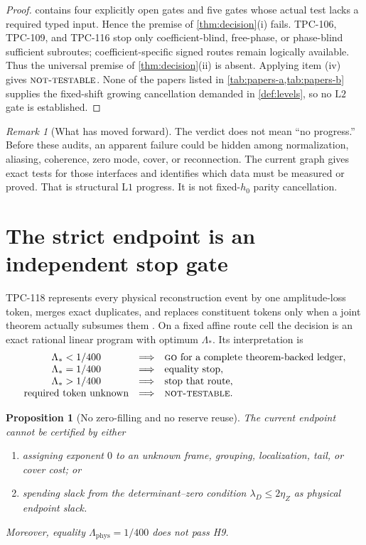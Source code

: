 \documentclass[11pt,a4paper]{article}
\newtheorem{proposition}[theorem]{Proposition}
\theoremstyle{definition}
\theoremstyle{remark}
\newtheorem{remark}[theorem]{Remark}
\newcommand{\Lone}{\mathrm{L1}}
\newcommand{\Ltwo}{\mathrm{L2}}
\newcommand{\Lam}{\Lambda_{\mathrm{phys}}}
\newcommand{\GO}{\textnormal{\textsc{go}}}
\newcommand{\NT}{\textnormal{\textsc{not-testable}}}
\begin{document}
\begin{proof}
 contains four explicitly open gates and five gates
whose actual test lacks a required typed input.  Hence the premise of
\cref{thm:decision}(i) fails.  TPC-106, TPC-109, and TPC-116 stop
only coefficient-blind, free-phase, or phase-blind sufficient
subroutes; coefficient-specific signed routes remain logically
available.  Thus the universal premise of
\cref{thm:decision}(ii) is absent.  Applying item (iv) gives
\(\NT\).  None of the papers listed in
\cref{tab:papers-a,tab:papers-b} supplies the fixed-shift growing
cancellation demanded in \cref{def:levels}, so no \(\Ltwo\) gate is
established.
\end{proof}

\begin{remark}[What has moved forward]
The verdict does not mean ``no progress.''  Before these audits, an
apparent failure could be hidden among normalization, aliasing,
coherence, zero mode, cover, or reconnection.  The current graph gives
exact tests for those interfaces and identifies which data must be
measured or proved.  That is structural \(\Lone\) progress.  It is
not fixed-\(h_0\) parity cancellation.
\end{remark}

\section{The strict endpoint is an independent stop gate}

TPC-118 represents every physical reconstruction event by one
amplitude-loss token, merges exact duplicates, and replaces
constituent tokens only when a joint theorem actually subsumes them
\citep{WangTPC118}.  On a fixed affine route cell the decision is an
exact rational linear program with optimum \(\Lambda_*\).  Its
interpretation is
\[
\begin{array}{ccl}
\Lambda_*<1/400
 &\Longrightarrow& \GO\ \text{for a complete theorem-backed ledger},\\
\Lambda_*=1/400
 &\Longrightarrow& \text{equality stop},\\
\Lambda_*>1/400
 &\Longrightarrow& \text{stop that route},\\
\text{required token unknown}
 &\Longrightarrow& \NT.
\end{array}
\]

\begin{proposition}[No zero-filling and no reserve reuse]
\label{prop:endpoint}
The current endpoint cannot be certified by either
\begin{enumerate}[label=(\alph*),leftmargin=2em]
\item assigning exponent \(0\) to an unknown frame, grouping,
localization, tail, or cover cost; or
\item spending slack from the determinant--zero condition
\(\lambda_D\le2\eta_Z\) as physical endpoint slack.
\end{enumerate}
Moreover, equality \(\Lam=1/400\) does not pass H9.
\end{proposition}
\end{document}
